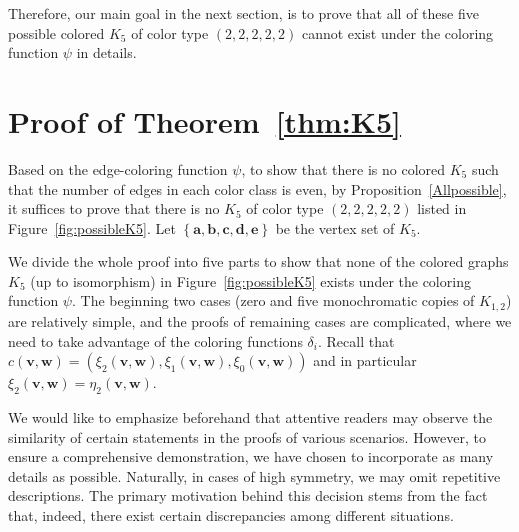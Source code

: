 \documentclass[11pt]{article}
\theoremstyle{definition}
\newcommand{\aaa}{\boldsymbol{a}}
\newcommand{\bb}{\boldsymbol{b}}
\newcommand{\cc}{\boldsymbol{c}}
\newcommand{\dd}{\boldsymbol{d}}
\newcommand{\ee}{\boldsymbol{e}}
\begin{document}
Therefore, our main goal in the next section, is to prove that all of these five possible colored $K_{5}$ of color type $(2,2,2,2,2)$ cannot exist under the coloring function $\psi$ in details.



\section{Proof of Theorem~\ref{thm:K5}}\label{sec:FormalProof}
Based on the edge-coloring function $\psi$, to show that there is no colored $K_{5}$ such that the number of edges in each color class is even, by Proposition~\ref{Allpossible}, it suffices to prove that there is no $K_{5}$ of color type $(2,2,2,2,2)$ listed in Figure~\ref{fig:possibleK5}. Let $\left\{\aaa,\bb,\cc,\dd,\ee\right\}$ be the vertex set of $K_5$.
 
We divide the whole proof into five parts to show that none of the colored graphs $K_{5}$ (up to isomorphism) in Figure~\ref{fig:possibleK5} exists under the coloring function $\psi$. The beginning two cases (zero and five monochromatic copies of $K_{1,2}$) are relatively simple, and the proofs of remaining cases are complicated, where we need to take advantage of the coloring functions $\delta_{i}$. Recall that $c(\boldsymbol{v},\boldsymbol{w})=(\xi_{2}(\boldsymbol{v},\boldsymbol{w}),\xi_{1}(\boldsymbol{v},\boldsymbol{w}),\xi_{0}(\boldsymbol{v},\boldsymbol{w}))$ and in particular $\xi_{2}(\boldsymbol{v},\boldsymbol{w})=\eta_{2}(\boldsymbol{v},\boldsymbol{w})$. 

We would like to emphasize beforehand that attentive readers may observe the similarity of certain statements in the proofs of various scenarios. However, to ensure a comprehensive demonstration, we have chosen to incorporate as many details as possible. Naturally, in cases of high symmetry, we may omit repetitive descriptions. The primary motivation behind this decision stems from the fact that, indeed, there exist certain discrepancies among different situations.
\end{document}
